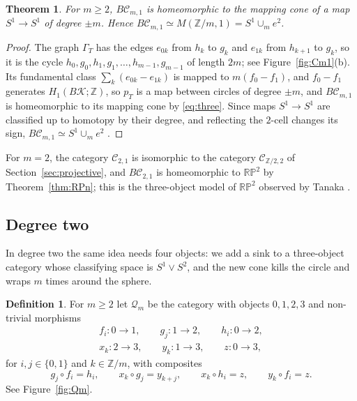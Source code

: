 \documentclass[12pt]{amsart}
\newtheorem{theorem}[teo]{Theorem}
\theoremstyle{definition}
\newtheorem{definition}[teo]{Definition}
\theoremstyle{remark}
\newcommand{\CC}{\mathcal{C}}
\newcommand{\co}{\colon}
\newcommand{\Z}{\mathbb{Z}}
\newcommand{\K}{\mathcal{K}}
\newcommand{\Q}{\mathcal{Q}}
\newcommand{\M}{M}
\newcommand{\RP}{\mathbb{RP}}
\begin{document}
\begin{theorem}\label{thm:Cm1}
For $m\ge2$, $B\CC_{m,1}$ is homeomorphic to the mapping cone of a map $S^1\to S^1$ of degree $\pm m$. Hence $B\CC_{m,1}\simeq\M(\Z/m,1)=S^1\cup_me^2$.
\end{theorem}

\begin{proof}
The graph $\Gamma_T$ has the edges $e_{0k}$ from $h_k$ to $g_k$ and $e_{1k}$ from $h_{k+1}$ to $g_k$, so it is the cycle $h_0,g_0,h_1,g_1,\dots,h_{m-1},g_{m-1}$ of length $2m$; see Figure~\ref{fig:Cm1}(b). Its fundamental class $\sum_k(e_{0k}-e_{1k})$ is mapped to $m(f_0-f_1)$, and $f_0-f_1$ generates $H_1(B\K;\Z)$, so $p_T$ is a map between circles of degree $\pm m$, and $B\CC_{m,1}$ is homeomorphic to its mapping cone by \eqref{eq:three}. Since maps $S^1\to S^1$ are classified up to homotopy by their degree, and reflecting the $2$-cell changes its sign, $B\CC_{m,1}\simeq S^1\cup_me^2$ \cite[Proposition~0.18]{Hatcher2002}.
\end{proof}

For $m=2$, the category $\CC_{2,1}$ is isomorphic to the category $\CC_{\Z/2,2}$ of Section~\ref{sec:projective}, and $B\CC_{2,1}$ is homeomorphic to $\RP^2$ by Theorem~\ref{thm:RPn}; this is the three-object model of $\RP^2$ observed by Tanaka \cite[Example~3.8]{Tanaka2018LS}.

\subsection{Degree two}\label{subsec:moore-degree-two}

In degree two the same idea needs four objects: we add a sink to a three-object category whose classifying space is $S^1\vee S^2$, and the new cone kills the circle and wraps $m$ times around the sphere.

\begin{definition}\label{def:Qm}
For $m\ge2$ let $\Q_m$ be the category with objects $0,1,2,3$ and non-trivial morphisms
\begin{gather*}
f_i\co0\to1,\qquad g_j\co1\to2,\qquad h_i\co0\to2,\\
x_k\co2\to3,\qquad y_k\co1\to3,\qquad z\co0\to3,
\end{gather*}
for $i,j\in\{0,1\}$ and $k\in\Z/m$, with composites
\[
g_j\circ f_i=h_i,\qquad x_k\circ g_j=y_{k+j},\qquad x_k\circ h_i=z,\qquad y_k\circ f_i=z.
\]
See Figure~\ref{fig:Qm}.
\end{definition}
\end{document}
